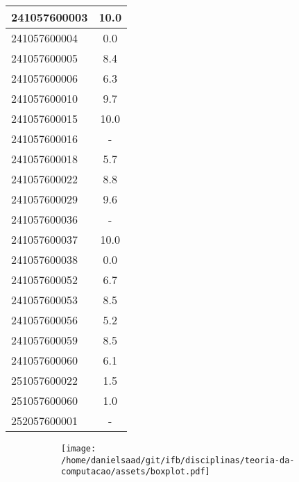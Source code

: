 \documentclass{article}
\begin{document}
\begin{longtable}{|l|c|}
241057600003 & 10.0\\\hline
241057600004 & 0.0\\\hline
241057600005 & 8.4\\\hline
241057600006 & 6.3\\\hline
241057600010 & 9.7\\\hline
241057600015 & 10.0\\\hline
241057600016 & -\\\hline
241057600018 & 5.7\\\hline
241057600022 & 8.8\\\hline
241057600029 & 9.6\\\hline
241057600036 & -\\\hline
241057600037 & 10.0\\\hline
241057600038 & 0.0\\\hline
241057600052 & 6.7\\\hline
241057600053 & 8.5\\\hline
241057600056 & 5.2\\\hline
241057600059 & 8.5\\\hline
241057600060 & 6.1\\\hline
251057600022 & 1.5\\\hline
251057600060 & 1.0\\\hline
252057600001 & -\\\hline
\end{longtable}
\begin{figure}[h!]
\centering\begin{subfigure}
        \centering
        \texttt{[image: /home/danielsaad/git/ifb/disciplinas/teoria-da-computacao/assets/boxplot.pdf]}
    \end{subfigure}\end{figure}
\end{document}
